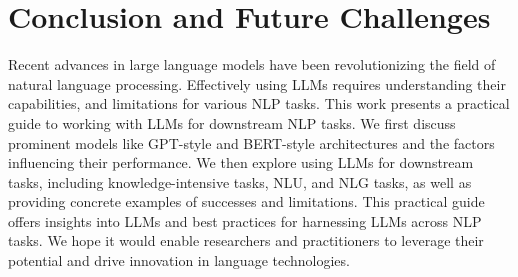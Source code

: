 \documentclass[manuscript,screen, nonacm]{acmart}
\begin{document}
\section{Conclusion and Future Challenges}




Recent advances in large language models have been revolutionizing the field of natural language processing. Effectively using LLMs requires understanding their capabilities, and limitations for various NLP tasks. This work presents a practical guide to working with LLMs for downstream NLP tasks. We first discuss prominent models like GPT-style and BERT-style architectures and the factors influencing their performance. We then explore using LLMs for downstream tasks, including knowledge-intensive tasks, NLU, and NLG tasks, as well as providing concrete examples of successes and limitations. This practical guide offers insights into LLMs and best practices for harnessing LLMs across NLP tasks. We hope it would enable researchers and practitioners to leverage their potential and drive innovation in language technologies.
\end{document}
